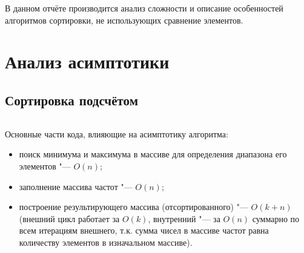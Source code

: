 \documentclass[otchet]{../SCWorks}
\begin{document}

\date{2026}

\maketitle

\secNumbering

\tableofcontents




\intro
В данном отчёте производится анализ сложности и описание особенностей алгоритмов сортировки, не использующих сравнение элементов.

\section{Анализ асимптотики}

\subsection{Сортировка подсчётом}
\small
\inputminted[breaklines]{cpp}{./counting_sort.cpp}
\normalsize

Основные части кода, влияющие на асимптотику алгоритма:

\begin{itemize}
	\item поиск минимума и максимума в массиве для определения диапазона его элементов "--- $O(n)$;
	\item заполнение массива частот "--- $O(n)$;
	\item построение результирующего массива (отсортированного) "--- $O(k + n)$ (внешний цикл работает за $O(k)$, внутренний "--- за $O(n)$ суммарно по всем итерациям внешнего, т.к. сумма чисел в массиве частот равна количеству элементов в изначальном массиве).
\end{itemize}
\end{document}
